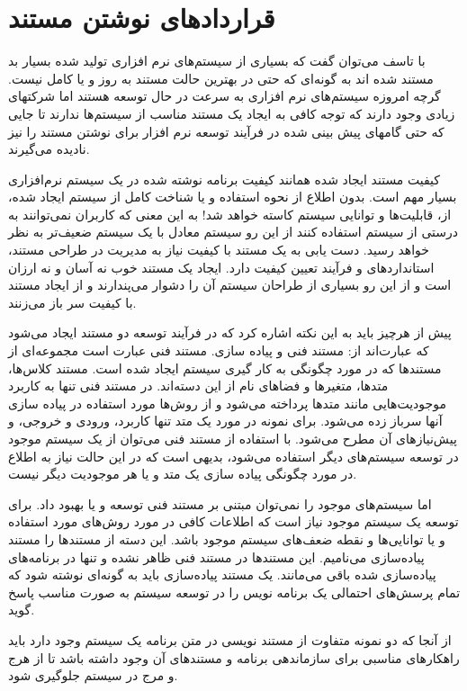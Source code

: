 
\part{قراردادهای نوشتن مستند}
    با تاسف می‌توان گفت که بسیاری از سیستم‌های نرم افزاری تولید شده بسیار بد
    مستند شده اند به گونه‌ای که حتی در بهترین حالت مستند به روز و یا کامل نیست.
    گرچه امروزه سیستم‌های نرم افزاری به سرعت در حال توسعه هستند اما شرکتهای
    زیادی وجود دارند که توجه کافی به ایجاد یک مستند مناسب از سیستم‌ها ندارند تا
    جایی که حتی گامهای پیش بینی شده در فرآیند توسعه نرم افزار برای نوشتن مستند
    را نیز نادیده می‌گیرند.

    کیفیت مستند ایجاد شده همانند کیفیت برنامه نوشته شده در یک سیستم نرم‌افزاری
    بسیار مهم است. بدون اطلاع از نحوه استفاده و یا شناخت کامل از سیستم ایجاد
    شده، از، قابلیت‌ها و توانایی سیستم کاسته خواهد شد! به این معنی که کاربران
    نمی‌توانند به درستی از سیستم استفاده کنند از این رو سیستم معادل با یک سیستم
    ضعیف‌تر به نظر خواهد رسید.
    دست یابی به یک مستند با کیفیت نیاز به مدیریت در طراحی مستند، استانداردهای و
    فرآیند تعیین کیفیت دارد.
    ایجاد یک مستند خوب نه آسان و نه ارزان است و از این رو بسیاری از طراحان سیستم
    آن را دشوار می‌پندارند و از ایجاد مستند با کیفیت سر باز می‌زنند.

پیش از هرچیز باید به این نکته اشاره کرد که در فرآیند توسعه دو مستند ایجاد می‌شود که
عبارت‌اند از: مستند فنی و پیاده سازی. مستند فنی عبارت است مجموعه‌ای از مستند‌ها که در 
مورد چگونگی به کار گیری سیستم ایجاد شده است. مستند کلاس‌ها، متدها، متغیرها و فضاهای نام
از این دسته‌اند. در مستند فنی تنها به کاربرد موجودیت‌هایی مانند متدها پرداخته می‌شود 
و از روش‌ها مورد استفاده در پیاده سازی آنها سرباز زده می‌شود. برای نمونه در مورد یک 
متد تنها کاربرد، ورودی و خروجی، و پیش‌نیازهای آن مطرح می‌شود. با استفاده از مستند فنی
می‌توان از یک سیستم موجود در توسعه سیستم‌های دیگر استفاده می‌شود، بدیهی است که در این 
حالت نیاز به اطلاع در مورد چگونگی پیاده سازی یک متد و یا هر موجودیت دیگر نیست.

اما سیستم‌های موجود را نمی‌توان مبتنی بر مستند فنی توسعه و یا بهبود داد. برای توسعه
یک سیستم موجود نیاز است که اطلاعات کافی در مورد روش‌های مورد استفاده و یا توانایی‌ها 
و نقطه ضعف‌های سیستم موجود باشد. این دسته از مستندها را مستند پیاده‌سازی می‌نامیم. 
این مستندها در مستند فنی ظاهر نشده و تنها در برنامه‌های پیاده‌سازی شده باقی می‌مانند.
یک مستند پیاده‌سازی باید به گونه‌ای نوشته شود که تمام پرسش‌های احتمالی یک برنامه نویس را 
در توسعه سیستم به صورت مناسب پاسخ گوید.

از آنجا که دو نمونه متفاوت از مستند نویسی در متن برنامه یک سیستم وجود دارد باید 
راهکارهای مناسبی برای سازماندهی برنامه و مستندهای آن وجود داشته باشد تا از هرج و 
مرج در سیستم جلوگیری شود.

